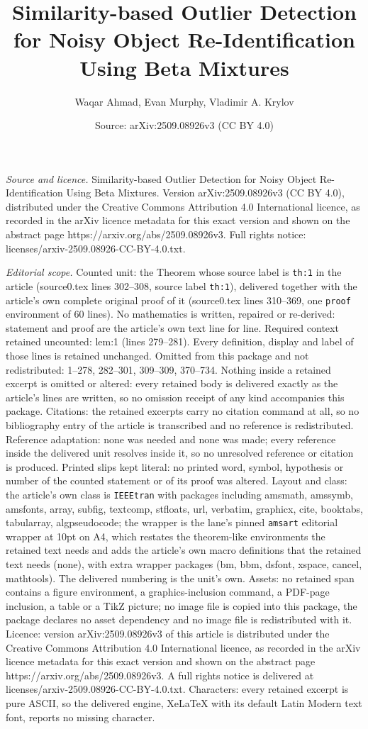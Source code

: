 \documentclass[10pt,a4paper]{amsart}
\title[Similarity-based Outlier Detection for Noisy Object Re-Ident]{Similarity-based Outlier Detection for Noisy Object Re-Identification Using Beta Mixtures}
\author{Waqar Ahmad, Evan Murphy, Vladimir A. Krylov}
\date{Source: arXiv:2509.08926v3 (CC BY 4.0)}
\begin{document}
\maketitle

\noindent\emph{Source and licence.} Similarity-based Outlier Detection for Noisy Object Re-Identification Using Beta Mixtures. Version arXiv:2509.08926v3 (CC BY 4.0), distributed under the Creative Commons Attribution 4.0 International licence, as recorded in the arXiv licence metadata for this exact version and shown on the abstract page https://arxiv.org/abs/2509.08926v3. Full rights notice: licenses/arxiv-2509.08926-CC-BY-4.0.txt.\par\smallskip

\noindent\textit{Editorial scope.} Counted unit: the Theorem whose source label is \texttt{th:1} in the article (source0.tex lines 302--308, source label \texttt{th:1}), delivered together with the article's own complete original proof of it (source0.tex lines 310--369, one \texttt{proof} environment of 60 lines). No mathematics is written, repaired or re-derived: statement and proof are the article's own text line for line. Required context retained uncounted: lem:1 (lines 279--281). Every definition, display and label of those lines is retained unchanged. Omitted from this package and not redistributed: 1--278, 282--301, 309--309, 370--734. Nothing inside a retained excerpt is omitted or altered: every retained body is delivered exactly as the article's lines are written, so no omission receipt of any kind accompanies this package. Citations: the retained excerpts carry no citation command at all, so no bibliography entry of the article is transcribed and no reference is redistributed. Reference adaptation: none was needed and none was made; every reference inside the delivered unit resolves inside it, so no unresolved reference or citation is produced. Printed slips kept literal: no printed word, symbol, hypothesis or number of the counted statement or of its proof was altered. Layout and class: the article's own class is \texttt{IEEEtran} with packages including amsmath, amssymb, amsfonts, array, subfig, textcomp, stfloats, url, verbatim, graphicx, cite, booktabs, tabularray, algpseudocode; the wrapper is the lane's pinned \texttt{amsart} editorial wrapper at 10pt on A4, which restates the theorem-like environments the retained text needs and adds the article's own macro definitions that the retained text needs (none), with extra wrapper packages (bm, bbm, dsfont, xspace, cancel, mathtools). The delivered numbering is the unit's own. Assets: no retained span contains a figure environment, a graphics-inclusion command, a PDF-page inclusion, a table or a TikZ picture; no image file is copied into this package, the package declares no asset dependency and no image file is redistributed with it. Licence: version arXiv:2509.08926v3 of this article is distributed under the Creative Commons Attribution 4.0 International licence, as recorded in the arXiv licence metadata for this exact version and shown on the abstract page https://arxiv.org/abs/2509.08926v3. A full rights notice is delivered at licenses/arxiv-2509.08926-CC-BY-4.0.txt. Characters: every retained excerpt is pure ASCII, so the delivered engine, XeLaTeX with its default Latin Modern text font, reports no missing character.
\end{document}

